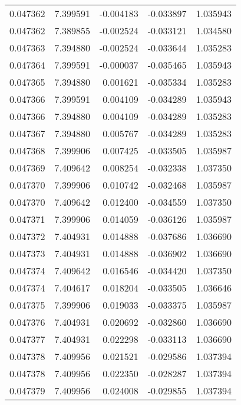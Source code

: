\begin{tabular}{lrrrr}
0.047362    &  7.399591 & -0.004183 & -0.033897 &             1.035943 \\
0.047362    &  7.389855 & -0.002524 & -0.033121 &             1.034580 \\
0.047363    &  7.394880 & -0.002524 & -0.033644 &             1.035283 \\
0.047364    &  7.399591 & -0.000037 & -0.035465 &             1.035943 \\
0.047365    &  7.394880 &  0.001621 & -0.035334 &             1.035283 \\
0.047366    &  7.399591 &  0.004109 & -0.034289 &             1.035943 \\
0.047366    &  7.394880 &  0.004109 & -0.034289 &             1.035283 \\
0.047367    &  7.394880 &  0.005767 & -0.034289 &             1.035283 \\
0.047368    &  7.399906 &  0.007425 & -0.033505 &             1.035987 \\
0.047369    &  7.409642 &  0.008254 & -0.032338 &             1.037350 \\
0.047370    &  7.399906 &  0.010742 & -0.032468 &             1.035987 \\
0.047370    &  7.409642 &  0.012400 & -0.034559 &             1.037350 \\
0.047371    &  7.399906 &  0.014059 & -0.036126 &             1.035987 \\
0.047372    &  7.404931 &  0.014888 & -0.037686 &             1.036690 \\
0.047373    &  7.404931 &  0.014888 & -0.036902 &             1.036690 \\
0.047374    &  7.409642 &  0.016546 & -0.034420 &             1.037350 \\
0.047374    &  7.404617 &  0.018204 & -0.033505 &             1.036646 \\
0.047375    &  7.399906 &  0.019033 & -0.033375 &             1.035987 \\
0.047376    &  7.404931 &  0.020692 & -0.032860 &             1.036690 \\
0.047377    &  7.404931 &  0.022298 & -0.033113 &             1.036690 \\
0.047378    &  7.409956 &  0.021521 & -0.029586 &             1.037394 \\
0.047378    &  7.409956 &  0.022350 & -0.028287 &             1.037394 \\
0.047379    &  7.409956 &  0.024008 & -0.029855 &             1.037394 \\

\end{tabular}
